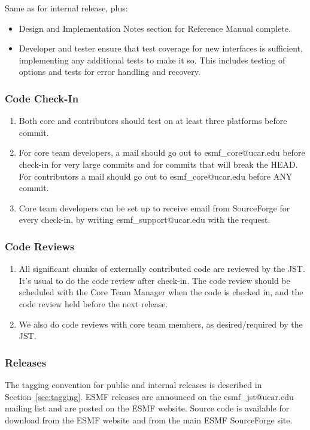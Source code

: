 Same as for internal release, plus:
\begin{itemize}
\item Design and Implementation Notes section for Reference Manual complete.
\item Developer and tester ensure that test coverage for new interfaces is sufficient, implementing any additional tests to make it so. This includes testing of options and tests for error handling and recovery.
\end{itemize}

\subsubsection{Code Check-In}
\begin{enumerate}
\item Both core and contributors should test on at least three platforms before commit.
\item For core team developers, a mail should go out to esmf\_core@ucar.edu
before check-in for very large commits and for commits that will break the
HEAD. For contributors a mail should go out to esmf\_core@ucar.edu before
ANY commit.
\item Core team developers can be set up to receive email from SourceForge
for every check-in, by writing esmf\_support@ucar.edu with the request.
\end{enumerate}

\subsubsection{Code Reviews}
\begin{enumerate}
\item All significant chunks of externally contributed code are reviewed
by the JST. It's usual to do the code review after check-in. The code review should
be scheduled with the Core Team Manager when the code is checked in, and
the code review held before the next release.
\item We also do code reviews with core team members, as desired/required
by the JST. 
\end{enumerate}

\subsubsection {Releases}

The tagging convention for public and internal releases is
described in Section~\ref{sec:tagging}.  ESMF releases are announced
on the esmf\_jst@ucar.edu mailing list and are posted on the ESMF
website.  Source code is available for download from the ESMF
website and from the main ESMF SourceForge site.












